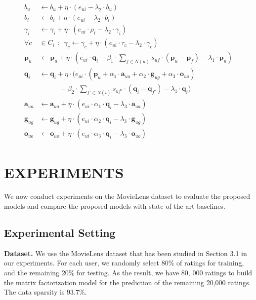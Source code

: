 \documentclass{llncs}
\begin{document}
	\noindent\hrulefill
	\begin{equation*}\label{4}
		\begin{split}
			b_u &\leftarrow b_u + \eta \cdot (e_{ui} -\lambda_2 \cdot b_u) \\
			b_i &\leftarrow b_i + \eta \cdot (e_{ui} -\lambda_2 \cdot b_i) \\
			\gamma_i &\leftarrow \gamma_i + \eta \cdot (e_{ui}\cdot \rho_i -\lambda_2 \cdot \gamma_i) \\
			\forall c &\in C_i  ~~:~~ \gamma_c \leftarrow \gamma_c + \eta \cdot (e_{ui}\cdot \tau_c -\lambda_2 \cdot \gamma_c) \\
			\mathbf{p}_u  &\leftarrow \mathbf{p}_u + \eta \cdot (e_{ui} \cdot \mathbf{q}_i - \beta_1\cdot\sum\limits_{f \in N(u)}s_{uf}\cdot(\mathbf{p}_u - \mathbf{p}_f)  - \lambda_1 \cdot \mathbf{p}_u) \\
			\mathbf{q}_i  &\leftarrow \mathbf{q}_i + \eta \cdot (e_{ui} \cdot (\mathbf{p}_u + \alpha_1\cdot\mathbf{a}_{ua} + \alpha_2\cdot\mathbf{g}_{ug}+ \alpha_3\cdot\mathbf{o}_{uo})\\
			&~~~~~~~~~~~~~-\beta_2\cdot\sum\limits_{f' \in N(i)}s_{u{f'}}\cdot(\mathbf{q}_i - \mathbf{q}_{f'})- \lambda_1 \cdot \mathbf{q}_i) \\
			\mathbf{a}_{ua} &\leftarrow \mathbf{a}_{ua} + \eta \cdot (e_{ui} \cdot\alpha_1\cdot \mathbf{q}_i - \lambda_3 \cdot \mathbf{a}_{ua})\\
			\mathbf{g}_{ug} &\leftarrow \mathbf{g}_{ug} + \eta \cdot (e_{ui} \cdot\alpha_2\cdot \mathbf{q}_i - \lambda_3 \cdot \mathbf{g}_{ug})\\
			\mathbf{o}_{uo} &\leftarrow \mathbf{o}_{uo} + \eta \cdot (e_{ui} \cdot\alpha_3\cdot \mathbf{q}_i - \lambda_3 \cdot \mathbf{o}_{uo})\\
		\end{split}
	\end{equation*}
	\hrulefill
	
	\section{EXPERIMENTS}
	We now conduct experiments on the MovieLens dataset to evaluate the
	proposed models and compare the proposed models with state-of-the-art baselines.
	\subsection{Experimental Setting}
	\noindent\textbf{Dataset.} We use the MovieLens dataset that has been studied in Section 3.1 in our experiments.
	For each user, we randomly select 80\% of ratings for training, and the remaining 20\% for testing.
	As the result, we have 80, 000 ratings to build the matrix factorization model for the prediction of the remaining 20,000 ratings.
	The data sparsity is 93.7\%.
	
\end{document}
